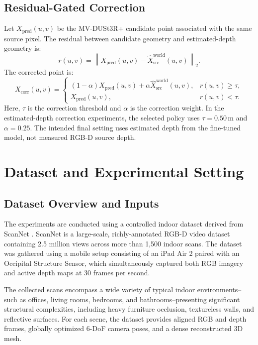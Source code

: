 \documentclass[12pt,a4paper]{article}
\newcommand{\mvdp}{MV-DUSt3R+}
\begin{document}
\subsection{Residual-Gated Correction}
Let \(X_{\mathrm{pred}}(u,v)\) be the \mvdp{} candidate point associated with the same source pixel. The residual between candidate geometry and estimated-depth geometry is:
\begin{equation}
r(u,v)=\left\|X_{\mathrm{pred}}(u,v)-\hat{X}^{\mathrm{world}}_{\mathrm{src}}(u,v)\right\|_2.
\end{equation}
The corrected point is:
\begin{equation}
X_{\mathrm{corr}}(u,v)=
\begin{cases}
(1-\alpha)X_{\mathrm{pred}}(u,v)+\alpha\hat{X}^{\mathrm{world}}_{\mathrm{src}}(u,v), & r(u,v)\geq\tau,\\
X_{\mathrm{pred}}(u,v), & r(u,v)<\tau.
\end{cases}
\end{equation}
Here, \(\tau\) is the correction threshold and \(\alpha\) is the correction weight. In the estimated-depth correction experiments, the selected policy uses \(\tau=0.50\,\mathrm{m}\) and \(\alpha=0.25\). The intended final setting uses estimated depth from the fine-tuned model, not measured RGB-D source depth.

\section{Dataset and Experimental Setting}

\subsection{Dataset Overview and Inputs}
The experiments are conducted using a controlled indoor dataset derived from ScanNet \cite{scannet}. ScanNet is a large-scale, richly-annotated RGB-D video dataset containing 2.5 million views across more than 1,500 indoor scans. The dataset was gathered using a mobile setup consisting of an iPad Air 2 paired with an Occipital Structure Sensor, which simultaneously captured both RGB imagery and active depth maps at 30 frames per second. 

The collected scans encompass a wide variety of typical indoor environments--such as offices, living rooms, bedrooms, and bathrooms--presenting significant structural complexities, including heavy furniture occlusion, textureless walls, and reflective surfaces. For each scene, the dataset provides aligned RGB and depth frames, globally optimized 6-DoF camera poses, and a dense reconstructed 3D mesh.
\end{document}
